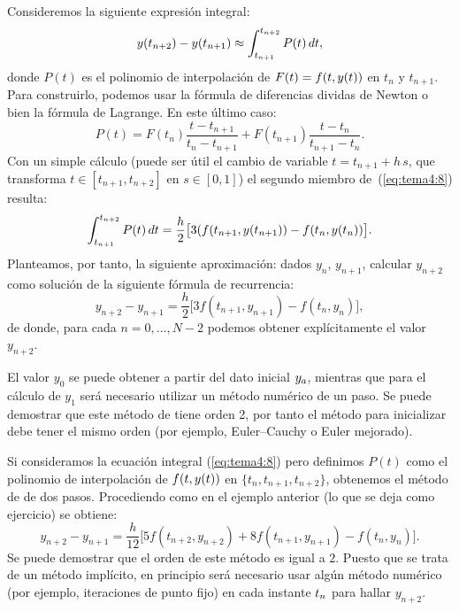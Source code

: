 \begin{example}
  \label{sec:AB-dos-pasos}
  Consideremos la siguiente expresión integral:
  \begin{equation}
   \label{eq:tema4:8}
   y(t_{n+2})-y(t_{n+1}) \approx \int_{t_{n+1}}^{t_{n+2}} P(t)\,dt,
  \end{equation}
  donde $P(t)$ es el polinomio de interpolación de $F(t)=f(t,y(t))$ en
  $t_n$ y $t_{n+1}$. Para construirlo, podemos usar la fórmula de
  diferencias dividas de Newton o bien la fórmula de Lagrange. En este
  último caso:
  \begin{equation*}
   P(t)=F(t_n)\frac{t-t_{n+1}}{t_n-t_{n+1}} +
   F(t_{n+1})\frac{t-t_{n}}{t_{n+1}-t_{n}}.
  \end{equation*}
  Con un simple cálculo (puede ser útil el cambio de variable $t =
  t_{n+1}+h\,s$, que transforma $t\in [t_{n+1},t_{n+2}]$ en $s\in [0,1]$)
  el segundo miembro de~(\ref{eq:tema4:8}) resulta:
  \begin{equation*}
  \int_{t_{n+1}}^{t_{n+2}} P(t)\,dt = \frac{h}{2} \big[
  3(f(t_{n+1},y(t_{n+1})) - f(t_{n},y(t_{n})) \big].
  \end{equation*}
  Planteamos, por tanto, la siguiente aproximación: dados $y_n$,
  $y_{n+1}$, calcular $y_{n+2}$ como solución de la
  siguiente fórmula de recurrencia:
  \begin{equation}
    \tag{AB2}
    \label{eq:AB2}
    y_{n+2}-y_{n+1} = \frac{h}{2} \big[
    3f(t_{n+1},y_{n+1}) - f(t_{n},y_{n}) \big],
  \end{equation}
  de donde, para cada $n=0,\dots,N-2$ podemos obtener explícitamente el
  valor $y_{n+2}$.

  El valor $y_0$ se puede obtener a partir del dato inicial ${y_a}$,
  mientras que para el cálculo de $y_1$ será necesario utilizar un
  método numérico de un paso. Se puede demostrar que este método
  de \AB tiene orden 2, por tanto el método para inicializar debe
  tener el mismo orden (por ejemplo, Euler--Cauchy o Euler mejorado).
\end{example}

\begin{example}
  Si consideramos la ecuación integral (\ref{eq:tema4:8}) pero
  definimos $P(t)$ como el polinomio de interpolación de
  $f(t,y(t))$ en $\{t_n,t_{n+1},t_{n+2}\}$, obtenemos el método
  de \AM de dos pasos. Procediendo como en el ejemplo anterior (lo que
  se deja como ejercicio) se obtiene:
  \begin{equation}
    \tag{AM2}
    \label{eq:AM2}
      y_{n+2}-y_{n+1} = \frac{h}{12} \big[
      5f(t_{n+2},y_{n+2}) + 8 f(t_{n+1},y_{n+1}) - f(t_{n},y_{n}) \big].
  \end{equation}
  Se puede demostrar que el orden de este método es igual a
  $2$. Puesto que se trata de un método implícito, en principio será
  necesario usar algún método numérico (por ejemplo, iteraciones de
  punto fijo) en cada instante ${t_n}$ para hallar $y_{n+2}$.
\end{example}

